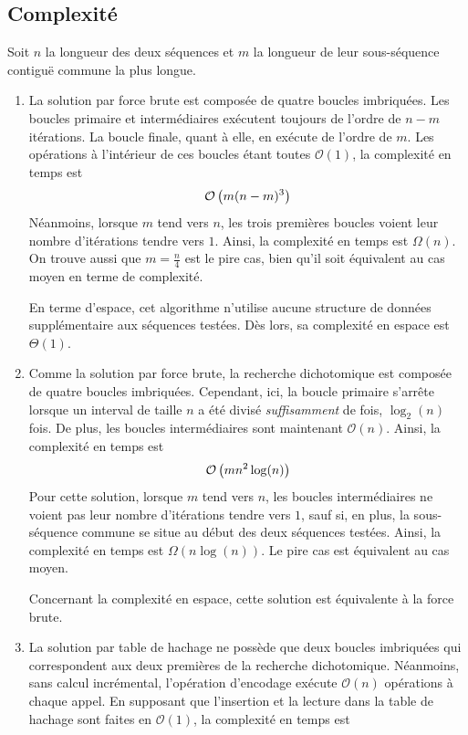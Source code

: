 \documentclass[a4paper, 12pt]{article}
\begin{document}
	\subsection{Complexité}\label{sec:complexity}
	Soit $n$ la longueur des deux séquences et $m$ la longueur de leur sous-séquence contiguë commune la plus longue.
	\begin{enumerate}[label=(\alph*)]
		\item La solution par force brute est composée de quatre boucles imbriquées. Les boucles primaire et intermédiaires exécutent toujours de l'ordre de $n - m$ itérations. La boucle finale, quant à elle, en exécute de l'ordre de $m$. Les opérations à l'intérieur de ces boucles étant toutes $\mathcal{O}(1)$, la complexité en temps est
		\begin{equation}
			\mathcal{O}\left(m (n - m)^3\right)
		\end{equation}
		Néanmoins, lorsque $m$ tend vers $n$, les trois premières boucles voient leur nombre d'itérations tendre vers $1$. Ainsi, la complexité en temps est $\Omega(n)$. On trouve aussi que $m = \frac{n}{4}$ est le pire cas, bien qu'il soit équivalent au cas moyen en terme de complexité. \par
		En terme d'espace, cet algorithme n'utilise aucune structure de données supplémentaire aux séquences testées. Dès lors, sa complexité en espace est $\Theta(1)$.
		\item Comme la solution par force brute, la recherche dichotomique est composée de quatre boucles imbriquées. Cependant, ici, la boucle primaire s'arrête lorsque un interval de taille $n$ a été divisé \emph{suffisamment} de fois, \cad{} $\log_2(n)$ fois. De plus, les boucles intermédiaires sont maintenant $\mathcal{O}(n)$. Ainsi, la complexité en temps est
		\begin{equation}
			\mathcal{O}\left(m n^2 \log(n)\right)
		\end{equation}
		Pour cette solution, lorsque $m$ tend vers $n$, les boucles intermédiaires ne voient pas leur nombre d'itérations tendre vers $1$, sauf si, en plus, la sous-séquence commune se situe au début des deux séquences testées. Ainsi, la complexité en temps est $\Omega(n \log(n))$. Le pire cas est équivalent au cas moyen. \par
		Concernant la complexité en espace, cette solution est équivalente à la force brute.
		\item La solution par table de hachage ne possède que deux boucles imbriquées qui correspondent aux deux premières de la recherche dichotomique. Néanmoins, sans calcul incrémental, l'opération d'encodage exécute $\mathcal{O}(n)$ opérations à chaque appel. En supposant que l'insertion et la lecture dans la table de hachage sont faites en $\mathcal{O}(1)$, la complexité en temps est

\end{enumerate}
\end{document}
